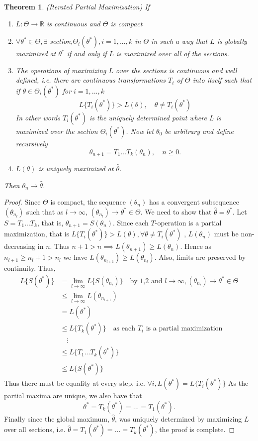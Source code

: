 \documentclass[12pt, leqno]{article}
\let\oldhat\hat
\renewcommand{\hat}[1]{\oldhat{{#1}}}
\newtheorem{thm}{Theorem}[]
\begin{document}
\begin{thm} \label{thm:ipm} (Iterated Partial Maximization) If
\begin{enumerate}
\item $L:\Theta \to \mathbb{R}$ is continuous and $\Theta$ is compact
\item $\forall \theta^* \in \Theta,\exists$
  section,$\Theta_i(\theta^*), i = 1,...,k$ in $\Theta$ in such a way
  that $L$ is globally maximized at $\theta^*$ if and only if $L$ is
  maximized over all of the sections.
\item The operations of maximizing $L$ over the sections is continuous
  and well defined, i.e. there are continuous transformations $T_i$ of
  $\Theta$ into itself such that if $\theta \in \Theta_i(\theta^*)$
  for $i = 1,...,k$
\[
L\{T_i(\theta^*)\} > L(\theta), \quad \theta \not=T_i(\theta^*)
\]
In other words $T_i(\theta^*)$ is the uniquely determined point where
L is maximized over the section $\Theta_i(\theta^*)$.
Now let $\theta_0$ be arbitrary and define recursively 
\[
\theta_{n+1} = T_1 ... T_k (\theta_n), \quad n \geq 0.
\]
\item $L(\theta)$ is uniquely maximized at $\hat{\theta}$.
\end{enumerate}
Then $\theta_n \to \hat{\theta}$.
\end{thm}
\begin{proof} Since $\Theta$ is compact, the sequence $(\theta_n)$
has a convergent subsequence $(\theta_{n_l})$ such that as $l \to
\infty$, $(\theta_{n_l}) \to \theta^* \in \Theta$. We need to show
that $\hat{\theta} = \theta^*$.  Let $S = T_1 ... T_k$, that is,
$\theta_{n+1} = S (\theta_n)$. Since each $T$-operation is a partial
maximization, that is $L\{T_i(\theta^*)\} > L(\theta), \forall \theta \not=T_i(\theta^*)
$ , $L(\theta_n)$ must be non-decreasing in $n$. Thus $n+1>n
\implies L(\theta_{n+1}) \geq L(\theta_{n})$. Hence as $n_{l+1} \geq
n_l + 1 > n_l$
we have $L(\theta_{n_{l+1}}) \geq L(\theta_{n_{l}})$. Also, limits are
preserved by continuity. Thus,
\begin{align*}
L\{S(\theta^*)\} &= \lim_{l\to\infty} L\{S(\theta_{n_l})\} \quad
                   \text{by 1,2 and } l \to
\infty,(\theta_{n_l}) \to \theta^* \in \Theta \\
&\leq \lim_{l\to\infty} L(\theta_{n_{l+1}}) \\
&= L(\theta^*) \\ 
&\leq L\{T_k(\theta^*)\} \quad \text{as each $T_i$ is a partial
  maximization}\\
&\quad \vdots \\
&\leq L\{T_1 ... T_k(\theta^*)\}\\
&\leq L\{S(\theta^*)\}
\end{align*}
Thus there must be equality at every step, i.e. $\forall i, L(\theta^*) =  L\{T_i(\theta^*)\}$ As the partial maxima are
unique, we also have that 
\[
\theta^* = T_k(\theta^*) = ... = T_1(\theta^*). 
\]
Finally since the global maximum, $\hat{\theta}$, was uniquely determined by maximizing
$L$ over all sections, i.e. $\hat{\theta} = T_1(\theta^*) = ... =  T_k(\theta^*)$, the proof is complete. 
\end{proof}
\end{document}
